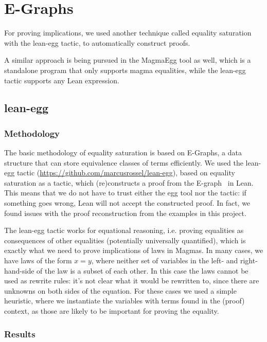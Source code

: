 \chapter{E-Graphs}

For proving implications, we used another technique called equality saturation~\cite{DBLP:journals/pacmpl/WillseyNWFTP21} with the lean-egg tactic, to automatically construct proofs.

A similar approach is being pursued in the MagmaEgg tool as well, which is a standalone program that only supports magma equalities, while the lean-egg tactic supports any Lean expression.

\section{lean-egg}

\subsection{Methodology}

The basic methodology of equality saturation is based on E-Graphs, a data structure that can store equivalence classes of terms efficiently.
We used the lean-egg tactic (\url{https://github.com/marcusrossel/lean-egg}), based on equality saturation as a tactic, which (re)constructs a proof from the E-graph~\cite{DBLP:journals/pacmpl/KoehlerGBGTS24} in Lean.
This means that we do not have to trust either the egg tool nor the tactic: if something goes wrong, Lean will not accept the constructed proof. In fact, we found issues with the proof reconstruction from the examples in this project.

The lean-egg tactic works for equational reasoning, i.e. proving equalities as consequences of other equalities (potentially universally quantified), which is exactly what we need to prove implications of laws in Magmas.
In many cases, we have laws of the form $x = y$, where neither set of variables in the left- and right-hand-side of the law is a subset of each other.
In this case the laws cannot be used as rewrite rules: it's not clear what it would be rewritten to, since there are unknowns on both sides of the equation.
For these cases we used a simple heuristic, where we instantiate the variables with terms found in the (proof) context, as those are likely to be important for proving the equality.

\subsection{Results}

